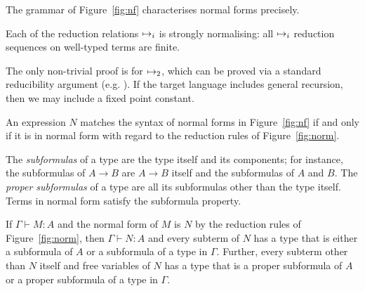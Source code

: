 The grammar of Figure~\ref{fig:nf} characterises normal forms
precisely.

\begin{proposition}
Each of the reduction relations $\mapsto_{i}$ is strongly
normalising: all $\mapsto_{i}$ reduction sequences on well-typed
terms are finite.
\end{proposition}
The only non-trivial proof is for $\mapsto_{2}$, which can be
proved via a standard reducibility argument
(e.g. \cite{Lindley07}). If the target language includes general
recursion, then we may include a fixed point constant.

\begin{proposition}
\label{prop_normal}
An expression $N$ matches the syntax of normal forms in
Figure~\ref{fig:nf} if and only if it is in normal form with regard to
the reduction rules of Figure~\ref{fig:norm}.
\end{proposition}

The \emph{subformulas} of a type are the type itself and its
components; for instance, the subformulas of $A \to B$ are $A \to B$
itself and the subformulas of $A$ and $B$. The \emph{proper
  subformulas} of a type are all its subformulas other than the type
itself.  Terms in normal form satisfy the subformula property.

\begin{proposition}
\label{prop_subformula}
If $\Gamma \vdash M:A$ and the normal form of $M$ is $N$ by the
reduction rules of Figure~\ref{fig:norm}, then $\Gamma \vdash N:A$ and
every subterm of $N$ has a type that is either a subformula of $A$ or
a subformula of a type in $\Gamma$.  Further, every subterm other than
$N$ itself and free variables of $N$ has a type that is a proper
subformula of $A$ or a proper subformula of a type in $\Gamma$.
\end{proposition}





